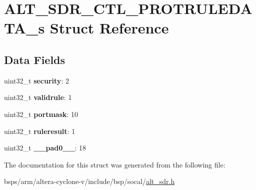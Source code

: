 \hypertarget{structALT__SDR__CTL__PROTRULEDATA__s}{}\section{A\+L\+T\+\_\+\+S\+D\+R\+\_\+\+C\+T\+L\+\_\+\+P\+R\+O\+T\+R\+U\+L\+E\+D\+A\+T\+A\+\_\+s Struct Reference}
\label{structALT__SDR__CTL__PROTRULEDATA__s}
\subsection*{Data Fields}
\begin{DoxyCompactItemize}
\item 
\mbox{\label{structALT__SDR__CTL__PROTRULEDATA__s_a6bb96b21a8cf0918e747c8261f95001b}} 
uint32\+\_\+t {\bfseries security}\+: 2
\item 
\mbox{\label{structALT__SDR__CTL__PROTRULEDATA__s_a60ee242c313eb5783fd2945597a79e77}} 
uint32\+\_\+t {\bfseries validrule}\+: 1
\item 
\mbox{\label{structALT__SDR__CTL__PROTRULEDATA__s_a259b2b7d349772d96b901b1d49c8787b}} 
uint32\+\_\+t {\bfseries portmask}\+: 10
\item 
\mbox{\label{structALT__SDR__CTL__PROTRULEDATA__s_a3b18174959cfc17fdba92918b1204490}} 
uint32\+\_\+t {\bfseries ruleresult}\+: 1
\item 
\mbox{\label{structALT__SDR__CTL__PROTRULEDATA__s_aed5d72d85e8b4a88d3835e30f41f90a6}} 
uint32\+\_\+t {\bfseries \+\_\+\+\_\+pad0\+\_\+\+\_\+}\+: 18
\end{DoxyCompactItemize}


The documentation for this struct was generated from the following file\+:\begin{DoxyCompactItemize}
\item 
bsps/arm/altera-\/cyclone-\/v/include/bsp/socal/\mbox{\hyperlink{alt__sdr_8h}{alt\+\_\+sdr.\+h}}\end{DoxyCompactItemize}

